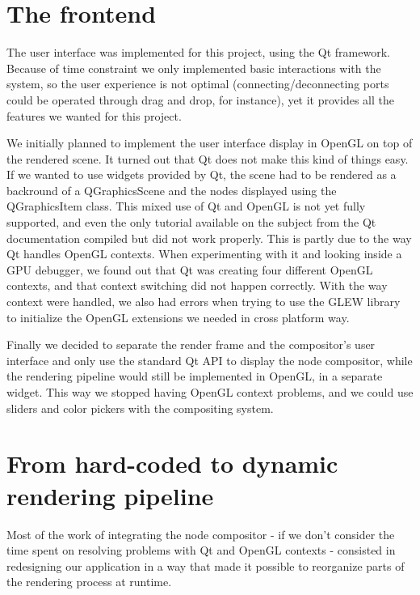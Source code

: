 \section{The frontend}

The user interface was implemented for this project, using the Qt framework. Because
of time constraint we only implemented basic interactions with the system, so the
user experience is not optimal (connecting/deconnecting ports could be operated
through drag and drop, for instance), yet it provides all the features we wanted for
this project.

We initially planned to implement the user interface display in OpenGL on top of
the rendered scene. It turned out that Qt does not make this kind of things easy.
If we wanted to use widgets provided by Qt, the scene had to be rendered as a
backround of a QGraphicsScene and the nodes displayed using the QGraphicsItem class.
This mixed use of Qt and OpenGL is not yet fully supported, and even the only tutorial
available on the subject from the Qt documentation compiled but did not work properly.
This is partly due to the way Qt handles OpenGL contexts. When experimenting with
it and looking inside a GPU debugger, we found out that Qt was creating four different
OpenGL contexts, and that context switching did not happen correctly. With the way
context were handled, we also had errors when trying to use the GLEW library to
initialize the OpenGL extensions we needed in cross platform way.

Finally we decided to separate the render frame and the compositor's user interface
and only use the standard Qt API to display the node compositor, while the rendering
pipeline would still be implemented in OpenGL, in a separate widget. This way we
stopped having OpenGL context problems, and we could use sliders and color pickers
with the compositing system.

\section{From hard-coded to dynamic rendering pipeline}

Most of the work of integrating the node compositor - if we don't consider the
time spent on resolving problems with Qt and OpenGL contexts - consisted in redesigning
our application in a way that made it possible to reorganize parts of the
rendering process at runtime.


